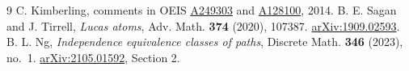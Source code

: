 \documentclass[11pt,letterpaper]{article}
\newcommand{\oeis}[1]{\href{https://oeis.org/A#1}{A#1}}
\begin{document}
\begin{thebibliography}{9}
 C. Kimberling, comments in OEIS \oeis{249303} and \oeis{128100}, 2014.
 B. E. Sagan and J. Tirrell, \emph{Lucas atoms}, Adv. Math. \textbf{374} (2020), 107387. \href{https://arxiv.org/abs/1909.02593}{arXiv:1909.02593}.
 B. L. Ng, \emph{Independence equivalence classes of paths}, Discrete Math. \textbf{346} (2023), no.~1. \href{https://arxiv.org/abs/2105.01592}{arXiv:2105.01592}, Section 2.
\end{thebibliography}
\end{document}
